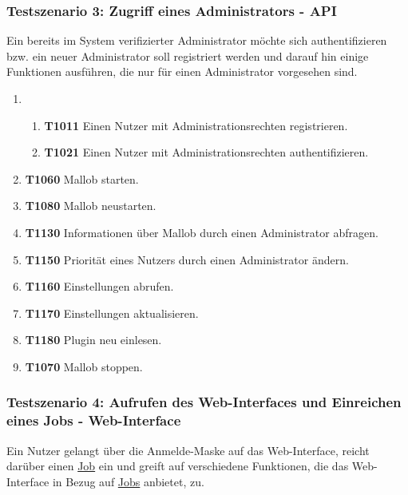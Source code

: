 \subsubsection{Testszenario 3: Zugriff eines Administrators - API}
Ein bereits im System verifizierter \gls{Administrator} möchte sich authentifizieren bzw. ein neuer \gls{Administrator} soll registriert werden und darauf hin einige Funktionen ausführen, die nur für einen \gls{Administrator} vorgesehen sind.

\begin{enumerate}
    \item
    \begin{enumerate}
        \item \textbf{T1011} Einen \gls{Nutzer} mit Administrationsrechten registrieren.
        
        \item \textbf{T1021} Einen \gls{Nutzer} mit Administrationsrechten authentifizieren. 
    \end{enumerate}
    
    \item \textbf{T1060} Mallob starten.
    
    \item \textbf{T1080} Mallob neustarten.
    
    \item \textbf{T1130} Informationen über Mallob durch einen \gls{Administrator} abfragen. 
    
    \item \textbf{T1150} Priorität eines Nutzers durch einen \gls{Administrator} ändern. 
    
    \item \textbf{T1160} Einstellungen abrufen.
    
    \item \textbf{T1170} Einstellungen aktualisieren. 
    
    \item \textbf{T1180} Plugin neu einlesen.
    
    \item \textbf{T1070} Mallob stoppen. 
\end{enumerate}

\subsubsection{Testszenario 4: Aufrufen des Web-Interfaces und Einreichen eines Jobs - Web-Interface}
Ein \gls{Nutzer} gelangt über die Anmelde-Maske auf das \gls{Web-Interface}, reicht darüber einen \hyperref[B:Jobs]{Job} ein und greift auf verschiedene Funktionen, die das \gls{Web-Interface} in Bezug auf \hyperref[B:Jobs]{Jobs} anbietet, zu.


